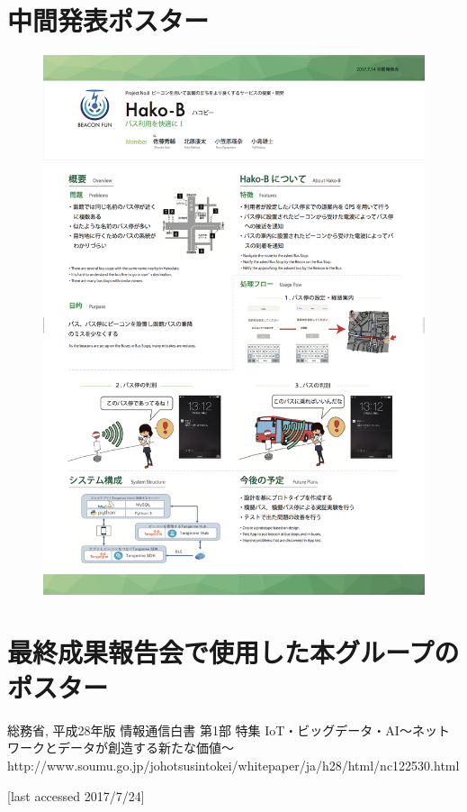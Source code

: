 \documentclass[openany,11pt,papersize]{jsbook}
\begin{document}
\begin{appendix}
\chapter{中間発表ポスター}
\begin{figure}[htbp]
  \begin{center}
    \includegraphics[clip,width=14cm]{img/poster.png}
    \label{fig:poster}
  \end{center}
\end{figure}

  \chapter{最終成果報告会で使用した本グループのポスター}
  
  \end{appendix}
  
  
  
  \begin{thebibliography}{9}
     総務省, 平成28年版 情報通信白書 第1部 特集 IoT・ビッグデータ・AI～ネットワークとデータが創造する新たな価値～
    http://www.soumu.go.jp/johotsusintokei/whitepaper/ja/h28/html/nc122530.html
  
    [last accessed 2017/7/24]
  \end{thebibliography}
  
  
\end{document}
